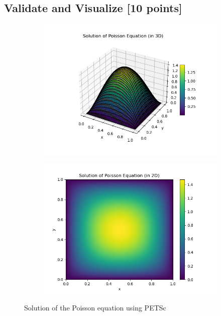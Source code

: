 \documentclass[unicode,11pt,a4paper,oneside,numbers=endperiod,openany]{scrartcl}
\begin{document}
\subsection{Validate and Visualize [10 points]}
\begin{figure}[H]
    \centering
    \begin{subfigure}[b]{0.45\textwidth} %
        \centering
        \includegraphics[width=\textwidth]{../src-5/poisson/solution_petsc_plot_3d.png} %
    \end{subfigure}
    \hfill %
    \begin{subfigure}[b]{0.45\textwidth} %
        \centering
        \includegraphics[width=\textwidth]{../src-5/poisson/solution_petsc_plot.png} %
    \end{subfigure}
    \caption{Solution of the Poisson equation using PETSc}
  \end{figure}
\end{document}
